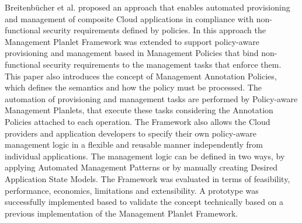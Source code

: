 Breitenb\"{u}cher et al. \cite{breitenbucher2014policy} proposed an approach that enables automated provisioning
and management of composite Cloud applications in compliance with non-functional security requirements defined by
policies. In this approach the Management Planlet Framework \cite{breitenbucher2013policy} was extended to support
policy-aware provisioning and management based in Management Policies that bind non-functional security requirements
to the management tasks that enforce them. This paper also introduces the concept of Management Annotation
Policies, which defines the semantics and how the policy must be processed. The automation of provisioning and
management tasks are performed by Policy-aware Management Planlets, that execute these tasks considering the
Annotation Policies attached to each operation. The Framework also allows the Cloud providers and application
developers to specify their own policy-aware management logic in a flexible and reusable manner independently
from individual applications. The management logic can be defined in two ways, by applying Automated Management
Patterns or by manually creating Desired Application State Models. The Framework was evaluated in terms of
feasibility, performance, economics, limitations and extensibility. A prototype was successfully implemented based
to validate the concept technically based on a previous implementation of the Management Planlet Framework.\\
